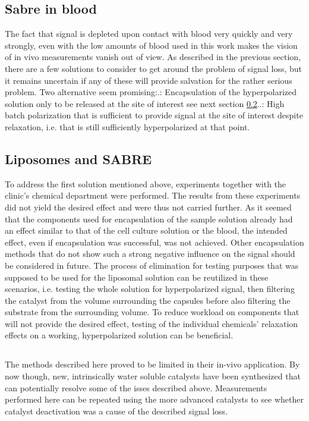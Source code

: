         \subsection{Sabre in blood}
        The fact that signal is depleted upon contact with blood very quickly and very strongly, even with the low amounts of blood used in this work makes the vision of in vivo measurements vanish out of view. As described in the previous section, there are a few solutions to consider to get around the problem of signal loss, but it remains uncertain if any of these will provide salvation for the rather serious problem. Two alternative seem promising:.: Encapsulation of the hyperpolarized solution only to be released at the site of interest see next section \ref{dc:subsec:liposomes}..: High batch polarization that is sufficient to provide signal at the site of interest despite relaxation, i.e. that is still sufficiently hyperpolarized at that point.
        \subsection{Liposomes and SABRE}
        \label{dc:subsec:liposomes}
        To address the first solution mentioned above, experiments together with the clinic's chemical department were performed. The results from these experiments did not yield the desired effect and were thus not carried further. As it seemed that the components used for encapsulation of the sample solution already had an effect similar to that of the cell culture solution or the blood, the intended effect, even if encapsulation was successful, was not achieved. Other encapsulation methods that do not show such a strong negative influence on the signal should be considered in future. The process of elimination for testing purposes that was supposed to be used for the liposomal solution can be reutilized in these scenarios, i.e. testing the whole solution for hyperpolarized signal, then filtering the catalyst from the volume surrounding the capsules before also filtering the substrate from the surrounding volume. To reduce workload on components that will not provide the desired effect, testing of the individual chemicals' relaxation effects on a working, hyperpolarized solution can be beneficial.
        \subsection*{}
        The methods described here proved to be limited in their in-vivo application. By now though, new, intrinsically water soluble catalysts have been synthesized \cite{spannring_new_2016} that can potentially resolve some of the isses described above. Measurements performed here can be repeated using the more advanced catalysts to see whether catalyst deactivation was a cause of the described signal loss.
